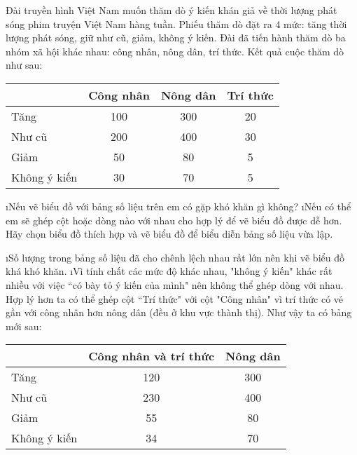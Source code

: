 \begin{bt}
	Đài truyền hình Việt Nam muốn thăm dò ý kiến khán giả về thời lượng phát sóng phim truyện Việt Nam hàng tuần. Phiếu thăm dò đặt ra 4 mức: tăng thời lượng phát sóng, giữ như cũ, giảm, không ý kiến. Đài đã tiến hành thăm dò ba nhóm xã hội khác nhau: công nhân, nông dân, trí thức. Kết quả cuộc thăm dò như sau:
	\begin{center}
		\begin{tabular}{|l|c|c|c|}
			\hline
			&Công nhân&	Nông dân&	Trí thức\\
			\hline
			Tăng&	100&	300&	20\\
			\hline
			Như cũ&	200&	400&	30\\
			\hline
			Giảm&	50&	80&	5\\
			\hline
			Không ý kiến&	30	&70&	5\\
			\hline
		\end{tabular}
	\end{center}
	\begin{enumerate}[a),leftmargin=*]
		\i Nếu vẽ biểu đồ với bảng số liệu trên em có gặp khó khăn gì không?
		\i Nếu có thể em sẽ ghép cột hoặc dòng nào với nhau cho hợp lý để vẽ biểu đồ được dễ hơn. Hãy chọn biểu đồ thích hợp và vẽ biểu đồ để biểu diễn bảng số liệu vừa lập.
	\end{enumerate}
	\begin{loigiaichuong40}
		\begin{enumerate}[a),leftmargin=*]
			\i Số lượng trong bảng số liệu đã cho chênh lệch nhau rất lớn nên khi vẽ biểu đồ khá khó khăn.
			\i Vì tính chất các mức độ khác nhau, "không ý kiến" khác rất nhiều với việc  ``có bày tỏ ý kiến của mình" nên không thể ghép dòng với nhau. Hợp lý hơn ta có thể ghép cột  ``Trí thức" với cột "Công nhân" vì trí thức có vẻ gần với công nhân hơn nông dân (đều ở khu vực thành thị). Như vậy ta có bảng mới sau:
			\begin{center}
				\begin{tabular}{|l|c|c|}
					\hline
					&Công nhân và trí thức&	Nông dân\\
					\hline
					Tăng&	120&	300\\
					\hline
					Như cũ&	230&	400\\
					\hline
					Giảm&	55&	80\\
					\hline
					Không ý kiến&	34&	70\\
					\hline
				\end{tabular}
			\end{center}
		\end{enumerate}
	\end{loigiaichuong40}
\end{bt}
